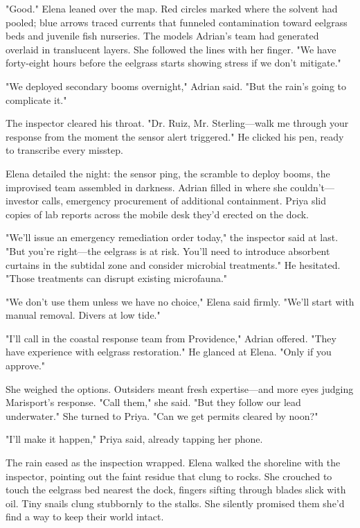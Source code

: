 "Good." Elena leaned over the map. Red circles marked where the solvent had pooled; blue arrows traced currents that funneled contamination toward eelgrass beds and juvenile fish nurseries. The models Adrian's team had generated overlaid in translucent layers. She followed the lines with her finger. "We have forty-eight hours before the eelgrass starts showing stress if we don't mitigate."

"We deployed secondary booms overnight," Adrian said. "But the rain's going to complicate it."

The inspector cleared his throat. "Dr. Ruiz, Mr. Sterling—walk me through your response from the moment the sensor alert triggered." He clicked his pen, ready to transcribe every misstep.

Elena detailed the night: the sensor ping, the scramble to deploy booms, the improvised team assembled in darkness. Adrian filled in where she couldn't—investor calls, emergency procurement of additional containment. Priya slid copies of lab reports across the mobile desk they'd erected on the dock.

"We'll issue an emergency remediation order today," the inspector said at last. "But you're right—the eelgrass is at risk. You'll need to introduce absorbent curtains in the subtidal zone and consider microbial treatments." He hesitated. "Those treatments can disrupt existing microfauna."

"We don't use them unless we have no choice," Elena said firmly. "We'll start with manual removal. Divers at low tide."

"I'll call in the coastal response team from Providence," Adrian offered. "They have experience with eelgrass restoration." He glanced at Elena. "Only if you approve."

She weighed the options. Outsiders meant fresh expertise—and more eyes judging Marisport's response. "Call them," she said. "But they follow our lead underwater." She turned to Priya. "Can we get permits cleared by noon?"

"I'll make it happen," Priya said, already tapping her phone.

The rain eased as the inspection wrapped. Elena walked the shoreline with the inspector, pointing out the faint residue that clung to rocks. She crouched to touch the eelgrass bed nearest the dock, fingers sifting through blades slick with oil. Tiny snails clung stubbornly to the stalks. She silently promised them she'd find a way to keep their world intact.

